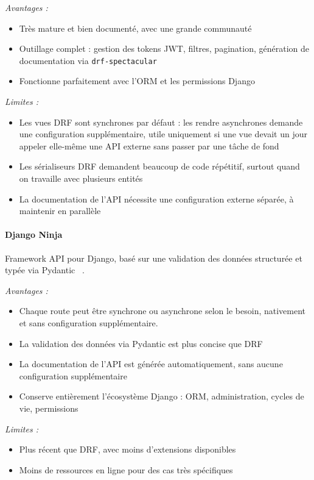 \textit{Avantages :}
\begin{itemize}
  \item Très mature et bien documenté,
        avec une grande communauté
  \item Outillage complet : gestion des tokens JWT,
        filtres, pagination, génération de
        documentation via \texttt{drf-spectacular}
  \item Fonctionne parfaitement avec l'ORM
        et les permissions Django
\end{itemize}

\textit{Limites :}
\begin{itemize}
  \item Les vues DRF sont synchrones par défaut :
        les rendre asynchrones demande une
        configuration supplémentaire, utile
        uniquement si une vue devait un jour
        appeler elle-même une API externe sans
        passer par une tâche de fond
  \item Les sérialiseurs DRF demandent beaucoup
        de code répétitif, surtout quand on
        travaille avec plusieurs entités
  \item La documentation de l'API nécessite
        une configuration externe séparée,
        à maintenir en parallèle
\end{itemize}

\paragraph{Django Ninja}
Framework API pour Django, basé sur une validation des données structurée et typée via Pydantic ~\cite{djangoninja_dev}.

\textit{Avantages :}
\begin{itemize}
    \item Chaque route peut être synchrone ou asynchrone selon le besoin, nativement et sans configuration supplémentaire.
  \item La validation des données via Pydantic
        est plus concise que DRF
  \item La documentation de l'API est générée
        automatiquement, sans aucune
        configuration supplémentaire
  \item Conserve entièrement l'écosystème Django :
        ORM, administration, cycles de vie,
        permissions
\end{itemize}

\textit{Limites :}
\begin{itemize}
  \item Plus récent que DRF, avec moins
        d'extensions disponibles
  \item Moins de ressources en ligne
        pour des cas très spécifiques
\end{itemize}

